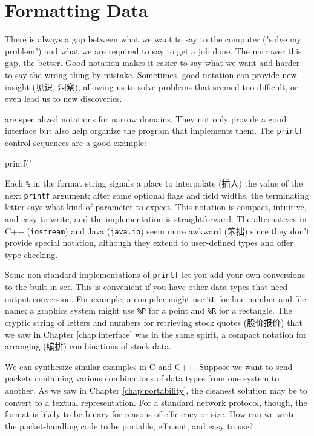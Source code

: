 \section{Formatting Data}
\label{sec:formatting_data}

There is always a gap between what we want to say to the computer ("solve
my problem") and what we are required to say to get a job done. The
narrower this gap, the better. Good notation makes it easier to say what we
want and harder to say the wrong thing by mistake. Sometimes, good notation
can provide new insight (见识, 洞察), allowing us to solve problems that
seemed too difficult, or even lead us to new discoveries.

 are specialized notations for narrow
domains. They not only provide a good interface but also help organize the
program that implements them. The \verb'printf' control sequences are a
good example:
\begin{wellcode}
    printf("%
\end{wellcode}

Each \verb'%' in the format string signals a place to interpolate (插入)
the value of the next \verb'printf' argument; after some optional flags and
field widths, the terminating letter says what kind of parameter to expect.
This notation is compact, intuitive, and easy to write, and the
implementation is straightforward. The alternatives in C++
(\verb'iostream') and Java (\verb'java.io') seem more awkward (笨拙) since
they don't provide special notation, although they extend to user-defined
types and offer type-checking.

Some non-standard implementations of \verb'printf' let you add your own
conversions to the built-in set. This is convenient if you have other data
types that need output conversion. For example, a compiler might use
\verb'%L' for line number and file name; a graphics system might use
\verb'%P' for a point and \verb'%R' for a rectangle. The cryptic string of
letters and numbers for retrieving stock quotes (股价报价) that we saw in
Chapter \ref{chap:interface} was in the same spirit, a compact notation for
arranging (编排) combinations of stock data.

We can synthesize similar examples in C and C++. Suppose we want to send
packets containing various combinations of data types from one system to
another.  As we saw in Chapter \ref{chap:portability}, the cleanest
solution may be to convert to a textual representation. For a standard
network protocol, though, the format is likely to be binary for reasons of
efficiency or size. How can we write the packet-handling code to be
portable, efficient, and easy to use?

